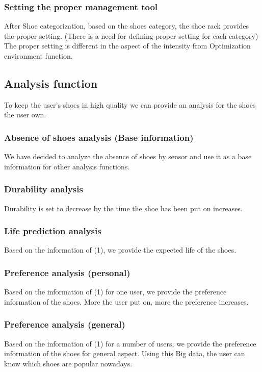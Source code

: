 \documentclass[conference]{IEEEtran}
\begin{document}
\subsubsection{Setting the proper management tool}
After Shoe categorization, based on the shoes category, the shoe rack provides the proper setting.
(There is a need for defining proper setting for each category)
The proper setting is different in the aspect of the intensity from Optimization environment function.\\


\subsection{Analysis function}
To keep the user's shoes in high quality we can provide an analysis for the shoes the user own.\\
\subsubsection{Absence of shoes analysis (Base information)}
We have decided to analyze the absence of shoes by sensor and use it as a base information for other analysis functions.\\
\subsubsection{Durability analysis}
Durability is set to decrease by the time the shoe has been put on increases. \\
\subsubsection{Life prediction analysis}
Based on the information of (1), we provide the expected  life of the shoes.\\
\subsubsection{Preference analysis (personal)}
Based on the information of (1) for one user, we provide the preference information of the shoes. More the user put on, more the preference increases.\\
\subsubsection{Preference analysis (general)}
Based on the information of (1) for a number of users, we provide the preference information of the shoes for general aspect. Using this Big data, the user can know which shoes are popular nowadays.
\end{document}
